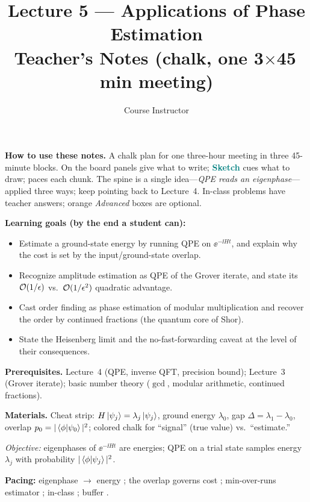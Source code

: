 \documentclass[11pt]{article}
\title{\textbf{Lecture 5 --- Applications of Phase Estimation}\\[0.3em]\large Teacher's Notes (chalk, one 3$\times$45\,min meeting)}
\author{Course Instructor}
\date{}
\begin{document}
\maketitle

\noindent\textbf{How to use these notes.} A chalk plan for one three-hour meeting in
three 45-minute blocks. \textsf{On the board} panels give what to write;
\textcolor{teal}{\textbf{Sketch}} cues what to draw;  paces each chunk. The
spine is a single idea---\emph{QPE reads an eigenphase}---applied three ways; keep
pointing back to Lecture~4. In-class problems have teacher answers; orange
\emph{Advanced} boxes are optional.

\medskip
\noindent\textbf{Learning goals (by the end a student can):}
\begin{itemize}[leftmargin=1.4em,nosep]
  \item Estimate a ground-state energy by running QPE on $\ee^{-\ii Ht}$, and explain why the cost is set by the input/ground-state overlap.
  \item Recognize amplitude estimation as QPE of the Grover iterate, and state its $\mathcal{O}(1/\epsilon)$ vs.\ $\mathcal{O}(1/\epsilon^2)$ quadratic advantage.
  \item Cast order finding as phase estimation of modular multiplication and recover the order by continued fractions (the quantum core of Shor).
  \item State the Heisenberg limit and the no-fast-forwarding caveat at the level of their consequences.
\end{itemize}

\medskip
\noindent\textbf{Prerequisites.} Lecture~4 (QPE, inverse QFT, precision bound);
Lecture~3 (Grover iterate); basic number theory ($\gcd$, modular arithmetic, continued
fractions).

\medskip
\noindent\textbf{Materials.} Cheat strip: $H\ket{\psi_j}=\lambda_j\ket{\psi_j}$,
ground energy $\lambda_0$, gap $\Delta=\lambda_1-\lambda_0$, overlap $p_0=|\braket{\phi|\psi_0}|^2$;
colored chalk for ``signal'' (true value) vs.\ ``estimate.''

\noindent\emph{Objective:} eigenphases of $\ee^{-\ii Ht}$ are energies; QPE on a trial
state samples energy $\lambda_j$ with probability $|\braket{\phi|\psi_j}|^2$.

\medskip
\noindent\textbf{Pacing:} eigenphase $\to$ energy ; the overlap governs cost
; min-over-runs estimator ; in-class ; buffer .
\end{document}
